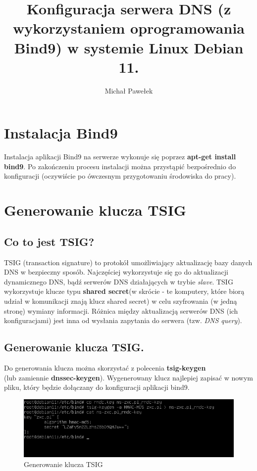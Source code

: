 \documentclass[12pt, a4paper]{article}
\title{Konfiguracja serwera DNS (z wykorzystaniem oprogramowania Bind9) w systemie Linux Debian 11.}
\author{Michał Pawełek}
\date{}
\begin{document}
\maketitle
\newpage

\tableofcontents
\newpage


\section{Instalacja Bind9}
        Instalacja aplikacji Bind9 na serwerze wykonuje się poprzez \textbf{apt-get install bind9}. Po zakończeniu procesu instalacji można przystąpić bezpośrednio do konfiguracji (oczywiście po ówczesnym przygotowaniu środowiska do pracy).

\section{Generowanie klucza TSIG}

    \subsection{Co to jest TSIG?}
        TSIG (transaction signature) to protokół umożliwiający aktualizację bazy danych DNS w bezpieczny sposób. Najczęściej wykorzystuje się go do aktualizacji dynamicznego DNS, bądź serwerów DNS działających w trybie \textit{slave}. TSIG wykorzystuje klucze typu \textbf{shared secret}(w skrócie - te komputery, które biorą udział w komunikacji znają klucz shared secret) w celu szyfrowania (w jedną stronę) wymiany informacji. Różnica między aktualizacją serwerów DNS (ich konfiguracjami) jest inna od wysłania zapytania do serwera (tzw. \textit{DNS query}).
        
    \subsection{Generowanie klucza TSIG.}
        Do generowania klucza można skorzystać z polecenia \textbf{tsig-keygen} \\(lub zamiennie \textbf{dnssec-keygen}). 
        Wygenerowany klucz najlepiej zapisać w nowym pliku, który będzie dołączany do konfiguracji aplikacji bind9.
        \begin{figure}[!h]
            \centering
            \includegraphics[width=\textwidth]{1.PNG}
            \caption{Generowanie klucza TSIG}
            \label{fig:TSIG}
        \end{figure}
        
\end{document}
